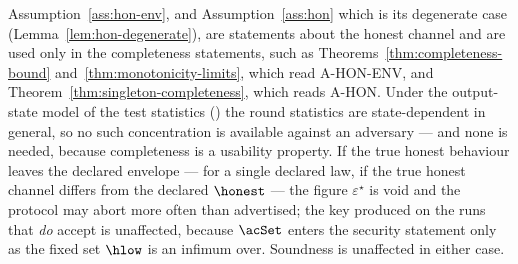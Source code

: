 
\begin{remark}\label{rem:sound-indep}
Assumption~\ref{ass:hon-env}, and Assumption~\ref{ass:hon} which is its
degenerate case (Lemma~\ref{lem:hon-degenerate}), are statements about the
honest channel and are used only in the completeness statements, such as
Theorems~\ref{thm:completeness-bound} and~\ref{thm:monotonicity-limits}, which read A-HON-ENV, and
Theorem~\ref{thm:singleton-completeness}, which reads A-HON. Under the output-state model of the
test statistics () the round statistics are
state-dependent in general, so no such concentration is available against an
adversary --- and none is needed, because completeness is a usability
property. If the true honest behaviour leaves the declared envelope --- for a
single declared law, if the true honest channel differs from the declared
$\honest$ --- the figure $\varepsilon^{\star}$ is void and the protocol may
abort more often than advertised; the key produced on the runs that
\emph{do} accept is unaffected, because $\acSet$ enters the security
statement only as the fixed set $\hlow$ is an infimum over. Soundness is
unaffected in either case.
\end{remark}
